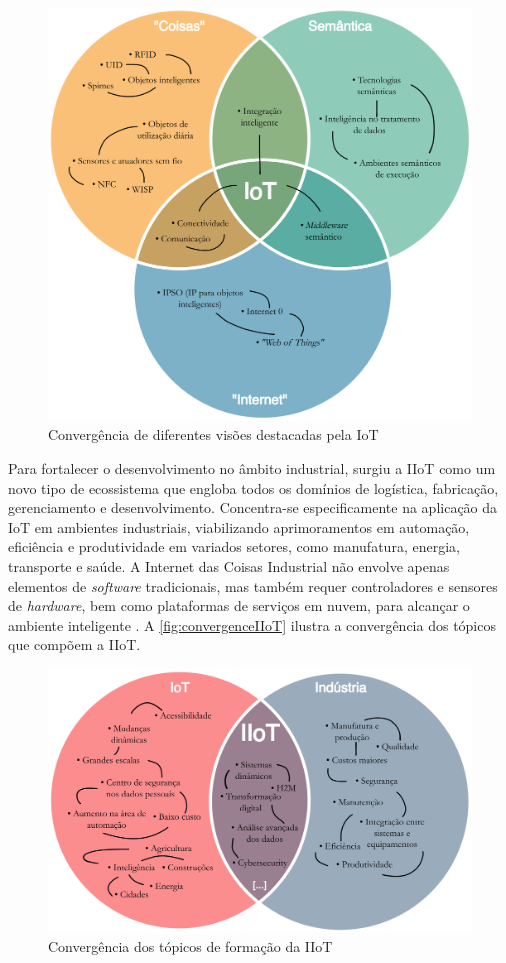     \begin{figure}[htbp]
        \caption{Convergência de diferentes visões destacadas pela IoT}
        \label{fig:convergenceIoT}
        \begin{center}
            \includegraphics[width=0.7\linewidth]{USPSC-img/convergenceIoT2.png}
        \end{center}
    \end{figure}
    
    Para fortalecer o desenvolvimento no âmbito industrial, surgiu a IIoT como um novo tipo de ecossistema que engloba todos os domínios de logística, fabricação, gerenciamento e desenvolvimento. Concentra-se especificamente na aplicação da IoT em ambientes industriais, viabilizando aprimoramentos em automação, eficiência e produtividade em variados setores, como manufatura, energia, transporte e saúde. A Internet das Coisas Industrial não envolve apenas elementos de \textit{software} tradicionais, mas também requer controladores e sensores de \textit{hardware}, bem como plataformas de serviços em nuvem, para alcançar o ambiente inteligente \cite{huichao2020}. A \autoref{fig:convergenceIIoT} ilustra a convergência dos tópicos que compõem a IIoT.

    \begin{figure}[htbp]
        \caption{Convergência dos tópicos de formação da IIoT}
        \label{fig:convergenceIIoT}
        \begin{center}
            \includegraphics[width=0.7\linewidth]{USPSC-img/convergenceIIoT2.png}
        \end{center}
    \end{figure}
    
